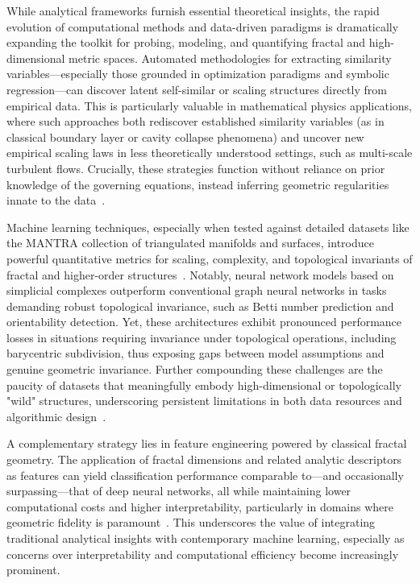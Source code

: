\documentclass[11pt]{article}
\begin{document}
While analytical frameworks furnish essential theoretical insights, the rapid evolution of computational methods and data-driven paradigms is dramatically expanding the toolkit for probing, modeling, and quantifying fractal and high-dimensional metric spaces. Automated methodologies for extracting similarity variables—especially those grounded in optimization paradigms and symbolic regression—can discover latent self-similar or scaling structures directly from empirical data. This is particularly valuable in mathematical physics applications, where such approaches both rediscover established similarity variables (as in classical boundary layer or cavity collapse phenomena) and uncover new empirical scaling laws in less theoretically understood settings, such as multi-scale turbulent flows. Crucially, these strategies function without reliance on prior knowledge of the governing equations, instead inferring geometric regularities innate to the data~\cite{ref65}.

Machine learning techniques, especially when tested against detailed datasets like the MANTRA collection of triangulated manifolds and surfaces, introduce powerful quantitative metrics for scaling, complexity, and topological invariants of fractal and higher-order structures~\cite{ref26,ref39}. Notably, neural network models based on simplicial complexes outperform conventional graph neural networks in tasks demanding robust topological invariance, such as Betti number prediction and orientability detection. Yet, these architectures exhibit pronounced performance losses in situations requiring invariance under topological operations, including barycentric subdivision, thus exposing gaps between model assumptions and genuine geometric invariance. Further compounding these challenges are the paucity of datasets that meaningfully embody high-dimensional or topologically "wild" structures, underscoring persistent limitations in both data resources and algorithmic design~\cite{ref39}.

A complementary strategy lies in feature engineering powered by classical fractal geometry. The application of fractal dimensions and related analytic descriptors as features can yield classification performance comparable to—and occasionally surpassing—that of deep neural networks, all while maintaining lower computational costs and higher interpretability, particularly in domains where geometric fidelity is paramount~\cite{ref26}. This underscores the value of integrating traditional analytical insights with contemporary machine learning, especially as concerns over interpretability and computational efficiency become increasingly prominent.
\end{document}
